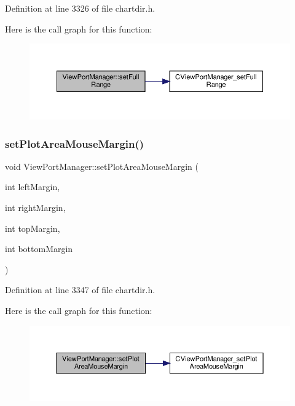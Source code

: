Definition at line 3326 of file chartdir.\+h.

Here is the call graph for this function\+:
\nopagebreak
\begin{figure}[H]
\begin{center}
\leavevmode
\includegraphics[width=350pt]{class_view_port_manager_accd91f779d15c0e92e1021a1954697d8_cgraph}
\end{center}
\end{figure}
\mbox{\label{class_view_port_manager_aa42a66b39276ed7707524cc8d901caef}} 
\subsubsection{\texorpdfstring{set\+Plot\+Area\+Mouse\+Margin()}{setPlotAreaMouseMargin()}}
{\footnotesize\ttfamily void View\+Port\+Manager\+::set\+Plot\+Area\+Mouse\+Margin (\begin{DoxyParamCaption}\item[{int}]{left\+Margin,  }\item[{int}]{right\+Margin,  }\item[{int}]{top\+Margin,  }\item[{int}]{bottom\+Margin }\end{DoxyParamCaption})\hspace{0.3cm}{\ttfamily [inline]}}



Definition at line 3347 of file chartdir.\+h.

Here is the call graph for this function\+:
\nopagebreak
\begin{figure}[H]
\begin{center}
\leavevmode
\includegraphics[width=350pt]{class_view_port_manager_aa42a66b39276ed7707524cc8d901caef_cgraph}
\end{center}
\end{figure}
\mbox{\label{class_view_port_manager_a16729686407f7efaa7bf11e2f912409e}} 
